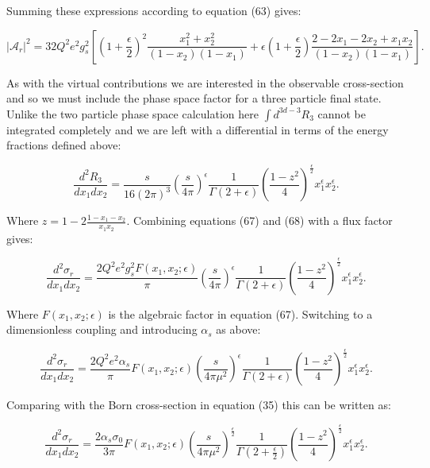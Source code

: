 	Summing these expressions according to equation (63) gives:

	\begin{equation*}
		|\mathcal{A}_r|^2 = 32Q^2e^2g_s^2\left[\left(1+\frac{\epsilon}{2}\right)^2\frac{x_1^2+x_2^2}{(1-x_2)(1-x_1)} +
		\epsilon\left(1+\frac{\epsilon}{2}\right)\frac{2-2x_1-2x_2+x_1x_2}{(1-x_2)(1-x_1)}\right].
	\end{equation*}

	As with the virtual contributions we are interested in the observable cross-section and so we must
	include the phase space factor for a three particle final state.  Unlike the two particle phase space
	calculation here $\int d^{3d-3}R_3$ cannot be integrated completely and we are left with a
	differential in terms of the energy fractions defined above:

	\begin{equation}
		\frac{d^2R_3}{dx_1dx_2} = \frac{s}{16(2\pi)^3}\left(\frac{s}{4\pi}\right)^\epsilon\frac{1}{\Gamma(2+\epsilon)}
		\left(\frac{1-z^2}{4}\right)^{\frac{\epsilon}{2}}x_1^\epsilon x_2^\epsilon.
	\end{equation}

	Where $z = 1 - 2\frac{1-x_1-x_2}{x_1x_2}$.  Combining equations (67) and (68) with a flux factor gives:

	\begin{equation}
		\frac{d^2\sigma_r}{dx_1dx_2} = \frac{2Q^2e^2g_s^2F(x_1, x_2; \epsilon)}{\pi}\left(\frac{s}{4\pi}\right)^\epsilon
		\frac{1}{\Gamma(2+\epsilon)}\left(\frac{1-z^2}{4}\right)^{\frac{\epsilon}{2}}x_1^\epsilon x_2^\epsilon.
	\end{equation}

	Where $F(x_1, x_2; \epsilon)$ is the algebraic factor in equation (67).  Switching to
	a dimensionless coupling and introducing $\alpha_s$ as above:

	\begin{equation}
		\frac{d^2\sigma_r}{dx_1dx_2} = \frac{2Q^2e^2\alpha_s}{\pi}F(x_1, x_2; \epsilon)\left(\frac{s}{4\pi\mu^2}\right)^\epsilon
		\frac{1}{\Gamma(2+\epsilon)}\left(\frac{1-z^2}{4}\right)^{\frac{\epsilon}{2}}x_1^\epsilon x_2^\epsilon.
	\end{equation}

	Comparing with the Born cross-section in equation (35) this can be written as:

	\begin{equation}
		\frac{d^2\sigma_r}{dx_1dx_2} = \frac{2\alpha_s\sigma_0}{3\pi}F(x_1, x_2; \epsilon)\left(\frac{s}{4\pi\mu^2}\right)^
		{\frac{\epsilon}{2}}\frac{1}{\Gamma(2+\frac{\epsilon}{2})}\left(\frac{1-z^2}{4}\right)^{\frac{\epsilon}{2}}x_1^\epsilon x_2^\epsilon.
	\end{equation}

